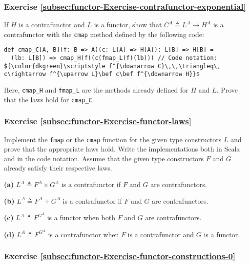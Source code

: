 \subsubsection{Exercise \label{subsec:functor-Exercise-contrafunctor-exponential}\ref{subsec:functor-Exercise-contrafunctor-exponential}}

If $H$ is a contrafunctor and $L$ is a functor, show that $C^{A}\triangleq L^{A}\rightarrow H^{A}$
is a contrafunctor with the \lstinline!cmap! method defined by the
following code:
\begin{lstlisting}[mathescape=true]
def cmap_C[A, B](f: B => A)(c: L[A] => H[A]): L[B] => H[B] =
  (lb: L[B]) => cmap_H(f)(c(fmap_L(f)(lb))) // Code notation: ${\color{dkgreen}\scriptstyle f^{\downarrow C}\,\,\triangleq\, c\rightarrow f^{\uparrow L}\bef c\bef f^{\downarrow H}}$
\end{lstlisting}
Here, \lstinline!cmap_H! and \lstinline!fmap_L! are the methods
already defined for $H$ and $L$. Prove that the laws hold for \lstinline!cmap_C!.

\subsubsection{Exercise \label{subsec:functor-Exercise-functor-laws}\ref{subsec:functor-Exercise-functor-laws}}

Implement the \lstinline!fmap! or the \lstinline!cmap! function
for the given type constructors $L$ and prove that the appropriate
laws hold. Write the implementations both in Scala and in the code
notation. Assume that the given type constructors $F$ and $G$ already
satisfy their respective laws.

\textbf{(a)} $L^{A}\triangleq F^{A}\times G^{A}$ is a contrafunctor
if $F$ and $G$ are contrafunctors.

\textbf{(b)} $L^{A}\triangleq F^{A}+G^{A}$ is a contrafunctor if
$F$ and $G$ are contrafunctors.

\textbf{(c)} $L^{A}\triangleq F^{G^{A}}$ is a functor when both $F$
and $G$ are contrafunctors.

\textbf{(d)} $L^{A}\triangleq F^{G^{A}}$ is a contrafunctor when
$F$ is a contrafunctor and $G$ is a functor.

\subsubsection{Exercise \label{subsec:functor-Exercise-functor-constructions-0}\ref{subsec:functor-Exercise-functor-constructions-0}}

